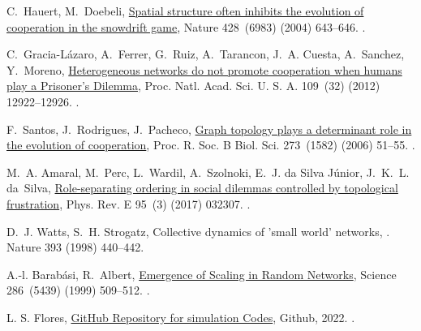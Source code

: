 \documentclass[5p,review]{elsarticle}
\begin{document}
\begin{thebibliography}{10}
C.~Hauert, M.~Doebeli,
  \href{http://www.nature.com/doifinder/10.1038/nature02360}{{Spatial structure
  often inhibits the evolution of cooperation in the snowdrift game}}, Nature
  428~(6983) (2004) 643--646.
\newblock \href {http://dx.doi.org/10.1038/nature02360}
  {}.
  
C.~Gracia-L\'{a}zaro, A.~Ferrer, G.~Ruiz, A.~Tarancon, J.~A. Cuesta, A.~Sanchez,
  Y.~Moreno,
  \href{http://www.pnas.org/cgi/doi/10.1073/pnas.1206681109}{{Heterogeneous
  networks do not promote cooperation when humans play a Prisoner's Dilemma}},  Proc. Natl. Acad. Sci. U. S. A. 109~(32) (2012) 12922--12926.
\newblock \href {http://dx.doi.org/10.1073/pnas.1206681109}
  {}.

F.~Santos, J.~Rodrigues, J.~Pacheco,
  \href{http://rspb.royalsocietypublishing.org/cgi/doi/10.1098/rspb.2005.3272}{{Graph  topology plays a determinant role in the evolution of cooperation}}, Proc. R.
  Soc. B Biol. Sci. 273~(1582) (2006) 51--55.
\newblock \href {http://dx.doi.org/10.1098/rspb.2005.3272}
  {}.

M.~A. Amaral, M.~Perc, L.~Wardil, A.~Szolnoki, E.~J. {da Silva J{\'{u}}nior},
  J.~K.~L. da~Silva,
  \href{http://link.aps.org/doi/10.1103/PhysRevE.95.032307}{{Role-separating
  ordering in social dilemmas controlled by topological frustration}}, Phys.
  Rev. E 95~(3) (2017) 032307.
\newblock \href {http://dx.doi.org/10.1103/PhysRevE.95.032307}
  {}.

D.~J. Watts, S.~H. Strogatz, {Collective dynamics of 'small world' networks},
\newblock \href {https://doi.org/10.1038/30918}
  {}.  Nature 393 (1998) 440--442.


A.-l. Barab{\'{a}}si, R.~Albert,
  \href{http://www.sciencemag.org/cgi/doi/10.1126/science.286.5439.509}{{Emergence
  of Scaling in Random Networks}}, Science 286~(5439) (1999) 509--512.
\newblock \href {http://dx.doi.org/10.1126/science.286.5439.509}
  {}.


L. S. Flores,
  \href{https://github.com/lucasflores42/Cooperation_in_regular_lattices}{{GitHub Repository for simulation Codes}}, Github, 2022.
\newblock \href {https://github.com/lucasflores42/Cooperation_in_regular_lattices}
  {}.
  


\end{thebibliography}
\end{document}
